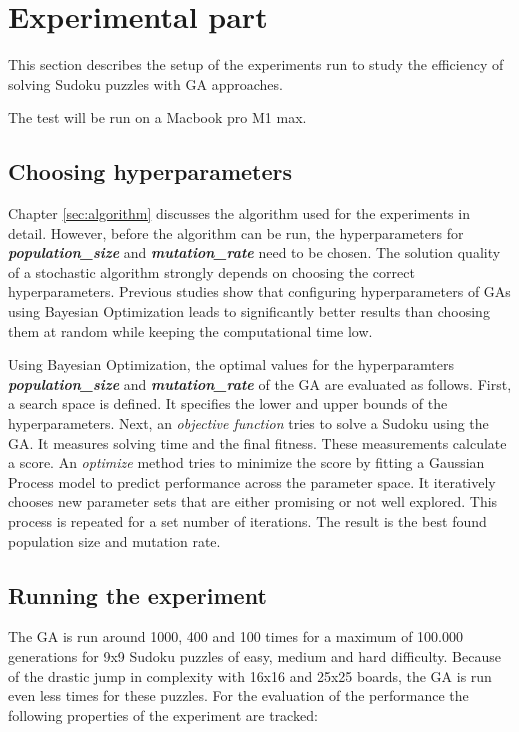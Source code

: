 \section{Experimental part}
\label{sec:experimentation}

This section describes the setup of the experiments run to study the efficiency of solving Sudoku puzzles with GA approaches.

The test will be run on a Macbook pro M1 max.

\subsection{Choosing hyperparameters}
Chapter \ref{sec:algorithm} discusses the algorithm used for the experiments in detail. However, before the algorithm can be run, the hyperparameters for \textit{\textbf{population\_size}} and \textit{\textbf{mutation\_rate}} need to be chosen. The solution quality of a stochastic algorithm strongly depends on choosing the correct hyperparameters. Previous studies show that configuring hyperparameters of GAs using Bayesian Optimization leads to significantly better results than choosing them at random while keeping the computational time low\cite{Ruether}.

Using Bayesian Optimization, the optimal values for the hyperparamters \textit{\textbf{population\_size}} and \textit{\textbf{mutation\_rate}} of the GA are evaluated as follows. First, a search space is defined. It specifies the lower and upper bounds of the hyperparameters. Next, an \textit{objective function} tries to solve a Sudoku using the GA. It measures solving time and the final fitness. These measurements calculate a score. An \textit{optimize} method tries to minimize the score by fitting a Gaussian Process model to predict performance across the parameter space. It iteratively chooses new parameter sets that are either promising or not well explored. This process is repeated for a set number of iterations. The result is the best found population size and mutation rate. 
\newpage

\subsection{Running the experiment}
The GA is run around 1000, 400 and 100 times for a maximum of 100.000 generations for 9x9 Sudoku puzzles of easy, medium and hard difficulty. Because of the drastic jump in complexity with 16x16 and 25x25 boards, the GA is run even less times for these puzzles. For the evaluation of the performance the following properties of the experiment are tracked:

